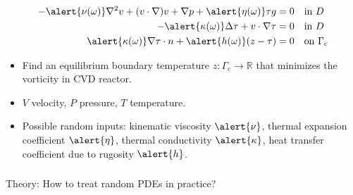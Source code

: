 \documentclass[aspectratio=169,xcolor=dvipsnames,10pt]{beamer}
\begin{document}
\begin{frame}
\begin{exampleblock}{}
\begin{minipage}{0.65\textwidth}
\begin{align*}
  -\alert{\nu(\omega)}\nabla^2 v + (v\cdot\nabla)v + \nabla p
      + \alert{\eta(\omega)} \tau g &= 0
    && \text{in }D \\
  -\alert{\kappa(\omega)} \Delta \tau + v\cdot\nabla \tau &= 0
    && \text{in }D\\
  \alert{\kappa(\omega)} \nabla \tau\cdot n + \alert{h(\omega)}(z-\tau) &=0
    && \text{on }\Gamma_c
\end{align*}
\end{minipage}
\begin{itemize}
\item Find an equilibrium boundary temperature $z : \Gamma_c \to \mathbb R$ that minimizes the vorticity in CVD reactor.
\item $V$ velocity, $P$ pressure, $T$ temperature.
\item Possible random inputs:  kinematic viscosity $\alert{\nu}$, thermal expansion coefficient  $\alert{\eta}$, thermal conductivity $\alert{\kappa}$,  heat transfer coefficient due to rugosity $\alert{h}$. 
\end{itemize}
\end{exampleblock}
\end{frame}

\begin{frame}\frametitle{}
\begin{center}\Large
Theory: How to treat random PDEs in practice?
\end{center}
\end{frame}


\end{document}
